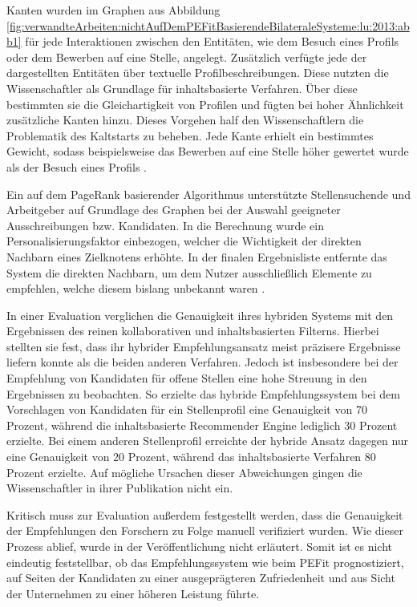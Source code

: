 Kanten wurden im Graphen aus Abbildung \ref{fig:verwandteArbeiten:nichtAufDemPEFitBasierendeBilateraleSysteme:lu:2013:abb1} für jede Interaktionen zwischen den Entitäten, wie dem Besuch eines Profils oder dem Bewerben auf eine Stelle, angelegt. Zusätzlich verfügte jede der dargestellten Entitäten über textuelle Profilbeschreibungen. Diese nutzten die Wissenschaftler als Grundlage für inhaltsbasierte Verfahren. Über diese bestimmten sie die Gleichartigkeit von Profilen und fügten bei hoher Ähnlichkeit zusätzliche Kanten hinzu. Dieses Vorgehen half den Wissenschaftlern die Problematik des Kaltstarts zu beheben. Jede Kante erhielt ein bestimmtes Gewicht, sodass beispielsweise das Bewerben auf eine Stelle höher gewertet wurde als der Besuch eines Profils \cite[S. 1ff.]{lu:2013}.

Ein auf dem PageRank basierender Algorithmus unterstützte Stellensuchende und Arbeitgeber auf Grundlage des Graphen bei der Auswahl geeigneter Ausschreibungen bzw. Kandidaten. In die Berechnung wurde ein Personalisierungsfaktor einbezogen, welcher die Wichtigkeit der direkten Nachbarn eines Zielknotens erhöhte. In der finalen Ergebnisliste entfernte das System die direkten Nachbarn, um dem Nutzer ausschließlich Elemente zu empfehlen, welche diesem bislang unbekannt waren \cite[S. 3]{lu:2013}.

In einer Evaluation verglichen \textcite[S. 3f.]{lu:2013} die Genauigkeit ihres hybriden Systems mit den Ergebnissen des reinen kollaborativen und inhaltsbasierten Filterns. Hierbei stellten sie fest, dass ihr hybrider Empfehlungsansatz meist präzisere Ergebnisse liefern konnte als die beiden anderen Verfahren. Jedoch ist insbesondere bei der Empfehlung von Kandidaten für offene Stellen eine hohe Streuung in den Ergebnissen zu beobachten. So erzielte das hybride Empfehlungssystem bei dem Vorschlagen von Kandidaten für ein Stellenprofil eine Genauigkeit von 70 Prozent, während die inhaltsbasierte Recommender Engine lediglich 30 Prozent erzielte. Bei einem anderen Stellenprofil erreichte der hybride Ansatz dagegen nur eine Genauigkeit von 20 Prozent, während das inhaltsbasierte Verfahren 80 Prozent erzielte. Auf mögliche Ursachen dieser Abweichungen gingen die Wissenschaftler in ihrer Publikation nicht ein.

Kritisch muss zur Evaluation außerdem festgestellt werden, dass die Genauigkeit der Empfehlungen den Forschern zu Folge manuell verifiziert wurden. Wie dieser Prozess ablief, wurde in der Veröffentlichung nicht erläutert. Somit ist es nicht eindeutig feststellbar, ob das Empfehlungssystem wie beim \ac{PEFit} prognostiziert, auf Seiten der Kandidaten zu einer ausgeprägteren Zufriedenheit und aus Sicht der Unternehmen zu einer höheren Leistung führte.

